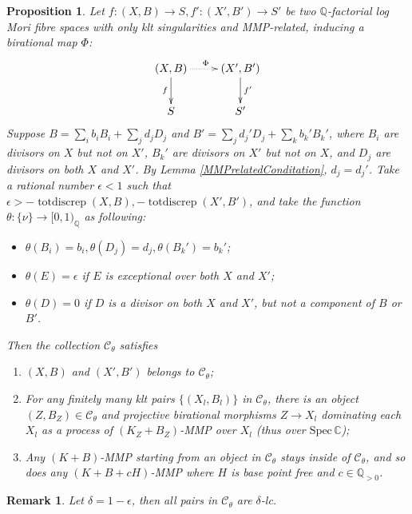 \documentclass[11pt]{amsart}
\newtheorem{prop}[defn]{Proposition}
\newtheorem{rmk}[defn]{Remark}
\begin{document}
\begin{prop}\label{cat}
  \cite[Lemma 3.6]{brunoLogSarkisovProgram1995}
  Let $ f:(X,B)\to S,f':(X',B')\to S' $ be two $ \mathbb{Q} $-factorial log Mori fibre spaces  with only klt singularities and MMP-related, inducing a birational map $\Phi$:
  \[ \xymatrix{
      (X,B)\ar[d]_f\ar@{.>}[r]^\Phi&(X',B')\ar[d]^{f'}\\
 S&S'} \]
 Suppose  $ B=\sum_ib_iB_i+\sum_jd_jD_j $ and $ B'=\sum_jd_j'D_j+\sum_kb_k'B_k' $, where $ B_i $ are divisors on $ X $ but not on $ X' $, $ B_k' $ are divisors on $ X' $ but not on $ X $, and $ D_j $ are divisors on both $ X $ and $ X' $. By Lemma \ref{MMPrelatedConditation}, $ d_j=d_j' $. Take a rational number $ \epsilon<1 $ such that $ \epsilon> -\operatorname{totdiscrep}(X,B),-\operatorname{totdiscrep}(X',B') $, and take the function $ \theta:\{\nu\}\to [0,1)_\mathbb{Q} $ as following:
  \begin{itemize}
    \item $ \theta(B_i)=b_i, \theta(D_j)=d_j,\theta(B_k')=b_k'$;
    \item $ \theta(E)=\epsilon $ if $ E $ is exceptional over both $ X $ and $ X' $;
    \item $ \theta(D)=0 $ if $ D $ is a divisor on both $ X $ and $ X' $, but not a component of $ B $ or $ B' $.
  \end{itemize}
  Then the collection $ \mathcal{C}_\theta $ satisfies
  \begin{enumerate}
    \item $ (X,B) $ and $ (X',B') $ belongs to $ \mathcal{C}_\theta $;
    \item For any finitely many klt pairs $ \{(X_l,B_l)\} $ in $ \mathcal{C}_\theta $, there is an object $ (Z,B_Z)\in \mathcal{C}_\theta $ and projective birational morphisms $ Z\to X_l $ dominating each  $ X_l $ as a process of $ (K_{Z}+B_{Z}) $-MMP over $ X_l $ (thus over $ \mathrm{Spec}\,\mathbb{C} $);
    \item Any $ (K+B) $-MMP starting from an object in $ \mathcal{C}_\theta $ stays inside of $ \mathcal{C}_\theta $, and so does any $ (K+B+cH) $-MMP where $ H $ is base point free and $ c\in \mathbb{Q}_{>0} $. 
  \end{enumerate}
\end{prop}
\begin{rmk}
Let $\delta=1-\epsilon$, then all pairs in $\mathcal{C}_{\theta}$ are $\delta$-lc. 
\end{rmk}
\end{document}
